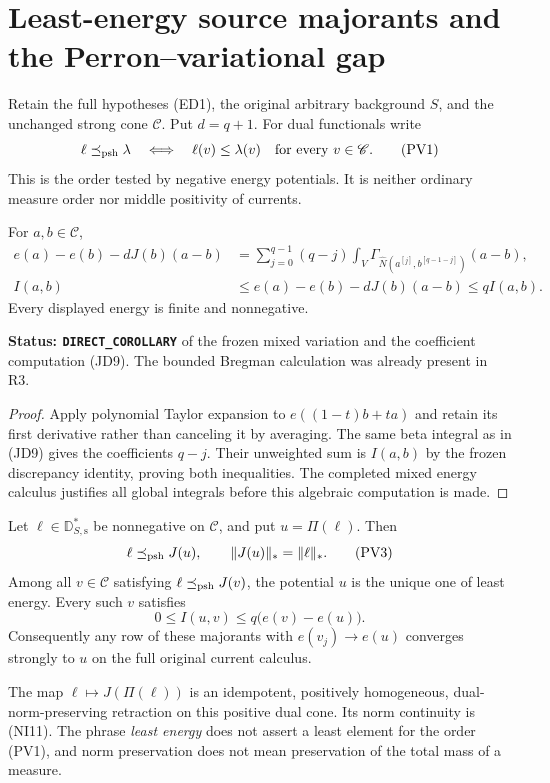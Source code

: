\section{Least-energy source majorants and the Perron--variational gap}
\label{sec:r12-perron-variational-gap}

Retain the full hypotheses (ED1), the original arbitrary background
$S$, and the unchanged strong cone $\mathscr C$. Put $d=q+1$.
For dual functionals write
\[
       \ell\preceq_{\rm psh}\lambda
       \quad\Longleftrightarrow\quad
       \ell(v)\leq\lambda(v)\quad\text{for every }v\in\mathscr C.
 \tag{PV1}
\]
This is the order tested by negative energy potentials. It is
neither ordinary measure order nor middle positivity of currents.

\begin{lemma}
\label{lem:r12-one-sided-Bregman}
For $a,b\in\mathscr C$,
\[
 \begin{split}
 e(a)-e(b)-dJ(b)(a-b)
  &=\sum_{j=0}^{q-1}(q-j)
       \int_V\Gamma_{\widehat N(a^{[j]},b^{[q-1-j]})}(a-b),\\
 I(a,b)&\leq e(a)-e(b)-dJ(b)(a-b)\leq qI(a,b).
 \end{split}
 \tag{PV2}
\]
Every displayed energy is finite and nonnegative.
\end{lemma}

\noindent\textbf{Status: \texttt{DIRECT\_COROLLARY}} of
the frozen mixed variation and the coefficient computation (JD9).
The bounded Bregman calculation was already present in R3.

\begin{proof}
Apply polynomial Taylor expansion to $e((1-t)b+ta)$ and
retain its first derivative rather than canceling it by
averaging. The same beta integral as in (JD9) gives the
coefficients $q-j$. Their unweighted sum is $I(a,b)$ by
the frozen discrepancy identity, proving both inequalities.
The completed mixed energy calculus justifies all global
integrals before this algebraic computation is made.
\end{proof}

\begin{theorem}
\label{thm:r12-least-energy-curvature-majorant}
Let $\ell\in\mathbb D_{S,\mathrm s}^*$ be nonnegative on
$\mathscr C$, and put $u=\Pi(\ell)$. Then
\[
       \ell\preceq_{\rm psh}J(u),\qquad
       \|J(u)\|_*=\|\ell\|_*.
 \tag{PV3}
\]
Among all $v\in\mathscr C$ satisfying
$\ell\preceq_{\rm psh}J(v)$, the potential $u$ is the
unique one of least energy. Every such $v$ satisfies
\[
               0\leq I(u,v)\leq q\bigl(e(v)-e(u)\bigr).
 \tag{PV4}
\]
Consequently any row of these majorants with
$e(v_j)\to e(u)$ converges strongly to $u$ on the full
original current calculus.

The map $\ell\mapsto J(\Pi(\ell))$ is an idempotent,
positively homogeneous, dual-norm-preserving retraction on
this positive dual cone. Its norm continuity is (NI11).
The phrase \emph{least energy} does not assert a least element
for the order (PV1), and norm preservation does not mean
preservation of the total mass of a measure.
\end{theorem}

